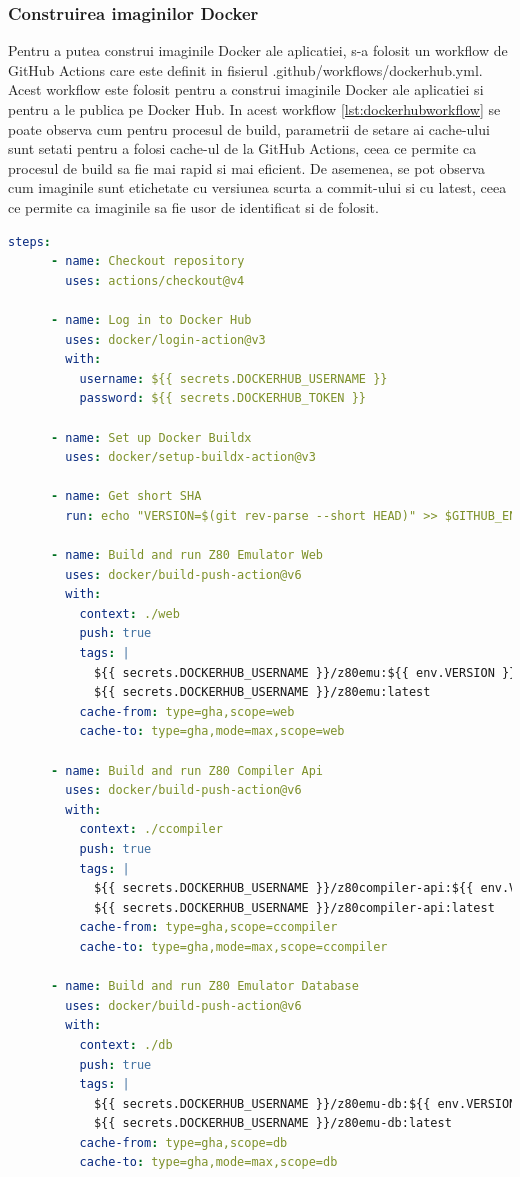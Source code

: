 \documentclass[titlepage,12pt]{article}
\DeclareRobustCommand{\code}[1]{{\ttfamily\small #1}}
\begin{document}
\subsubsection{Construirea imaginilor Docker}
Pentru a putea construi imaginile Docker ale aplicatiei, s-a folosit un workflow de GitHub Actions care este definit in fisierul \code{.github/workflows/dockerhub.yml}. Acest workflow este folosit pentru a construi imaginile Docker ale aplicatiei si pentru a le publica pe Docker Hub. In acest workflow \cref{lst:dockerhubworkflow} se poate observa cum pentru procesul de build, parametrii de setare ai cache-ului sunt setati pentru a folosi cache-ul de la GitHub Actions, ceea ce permite ca procesul de build sa fie mai rapid si mai eficient. De asemenea, se pot observa cum imaginile sunt etichetate cu versiunea scurta a commit-ului si cu \code{latest}, ceea ce permite ca imaginile sa fie usor de identificat si de folosit.

\begin{lstlisting}[language=yaml,caption={Workflow de construire a imaginilor Docker},label={lst:dockerhubworkflow}]
    steps:
      - name: Checkout repository
        uses: actions/checkout@v4

      - name: Log in to Docker Hub
        uses: docker/login-action@v3
        with:
          username: ${{ secrets.DOCKERHUB_USERNAME }}
          password: ${{ secrets.DOCKERHUB_TOKEN }}

      - name: Set up Docker Buildx
        uses: docker/setup-buildx-action@v3

      - name: Get short SHA
        run: echo "VERSION=$(git rev-parse --short HEAD)" >> $GITHUB_ENV

      - name: Build and run Z80 Emulator Web
        uses: docker/build-push-action@v6
        with:
          context: ./web
          push: true
          tags: |
            ${{ secrets.DOCKERHUB_USERNAME }}/z80emu:${{ env.VERSION }}
            ${{ secrets.DOCKERHUB_USERNAME }}/z80emu:latest
          cache-from: type=gha,scope=web
          cache-to: type=gha,mode=max,scope=web

      - name: Build and run Z80 Compiler Api
        uses: docker/build-push-action@v6
        with:
          context: ./ccompiler
          push: true
          tags: |
            ${{ secrets.DOCKERHUB_USERNAME }}/z80compiler-api:${{ env.VERSION }}
            ${{ secrets.DOCKERHUB_USERNAME }}/z80compiler-api:latest
          cache-from: type=gha,scope=ccompiler
          cache-to: type=gha,mode=max,scope=ccompiler

      - name: Build and run Z80 Emulator Database
        uses: docker/build-push-action@v6
        with:
          context: ./db
          push: true
          tags: |
            ${{ secrets.DOCKERHUB_USERNAME }}/z80emu-db:${{ env.VERSION }}
            ${{ secrets.DOCKERHUB_USERNAME }}/z80emu-db:latest
          cache-from: type=gha,scope=db
          cache-to: type=gha,mode=max,scope=db
\end{lstlisting}
\end{document}
